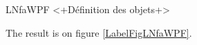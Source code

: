 
\begin{exercice}\label{exosmath-0490}

LNfaWPF
<+Définition des objets+>


The result is on figure \ref{LabelFigLNfaWPF}. %
\newcommand{\CaptionFigLNfaWPF}{<+Type your caption here+>}



\end{exercice}
